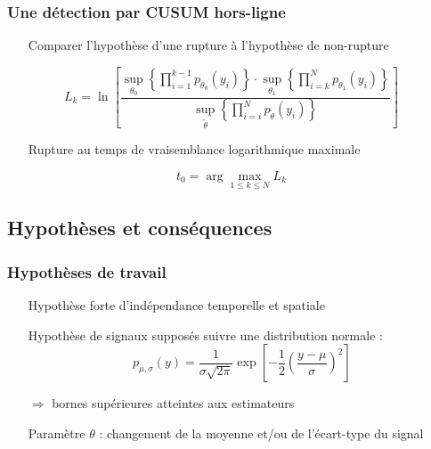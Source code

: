 \documentclass{beamer}
\begin{document}
\begin{frame}

	\frametitle{Une détection par CUSUM hors-ligne}

	\begin{itemize}
		\item[Comparer] l'hypothèse d'une rupture à l'hypothèse de non-rupture
	\end{itemize}

\vspace{-.4cm}
	\begin{equation}
		L _k =\ln \left[ \frac{\sup_{\theta_0}\left\{ \prod_{i=1}^{k-1} p_{\theta_0}(y_i) \right\} \cdot \sup_{\theta_1} \left\{ \prod_{i = k}^{N}p_{\theta_1}(y_i) \right\}}{\sup_{\tilde\theta}\left\{\prod_{i=i}^{N}p_{\tilde{\theta}}(y_i)\right\}} \right]
	\end{equation}
\phantom{kcahkcah}

	\begin{itemize}
		\item[Rupture] au temps de vraisemblance logarithmique maximale
	\end{itemize}

\vspace{-.4cm}
	\begin{equation}
		t_0 = \arg \max_{1 \leq k \leq N} L_k
	\end{equation}
	
\end{frame}

\subsection{Hypothèses et conséquences}

\begin{frame}
	\frametitle{Hypothèses de travail}
	
	\begin{itemize}
		\item[Hypothèse] forte d'indépendance temporelle et spatiale
		\item[Hypothèse] de signaux supposés suivre une distribution normale :
	\begin{equation}
		p_{\mu, \sigma}(y) = \frac1{\sigma\sqrt{2 \pi}} \exp \left[ -\frac12 \left( \frac{y - \mu}{\sigma} \right)^2 \right]
	\end{equation}
		\item[$\Longrightarrow$] bornes supérieures atteintes aux estimateurs
		\vspace{.4cm}
		\item[Paramètre] $\theta$ : changement de la moyenne et/ou de l'écart-type du signal
	\end{itemize}
\end{frame}
\end{document}
